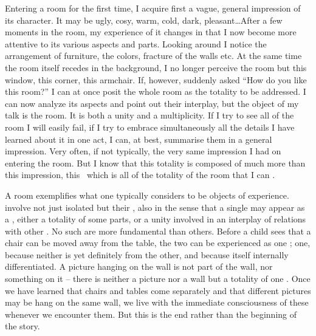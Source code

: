  \pa\label{th:complact} Entering a room for the first time, I
acquire first a vague, general impression of its character. It may be ugly,
cosy, warm, cold, dark, pleasant\ldots After a few moments in the room, my
experience of it changes in that I now become more attentive to its various
aspects and parts. Looking around I notice the arrangement of furniture, the
colors, fracture of the walls etc. At the same time the room itself recedes in
the background, I no longer perceive the room but this window, this corner, this
armchair.  If, however, suddenly asked ``How do you like this room?'' I can at
once posit the whole room as the totality to be addressed. I can now analyze its
aspects and point out their interplay, but the object of my talk is the room. It
is both a unity and a multiplicity. If I try to see all of the room I will
easily fail, if I try to embrace simultaneously all the details I have learned
about it in one act, I can, at best, summarise them in a general impression.
Very often, if not typically, the very same impression I had on entering the
room. But I know that this totality is composed of much more than this
impression, this \os\ which is all of the totality of the room that I can
.

A room exemplifies what one typically considers to be objects of experience.
 involve not just isolated  but their
, also in the sense that a single  may appear as a
, either a totality of some parts, or a unity involved in an
interplay of relations with other .  No such  are more
fundamental than others.  Before a child sees that a chair can be moved away
from the table, the two can be experienced as one ; one, because
neither is yet definitely  from the other, and 
because itself internally differentiated.  A picture hanging on the wall is not
part of the wall, nor something on it -- there is neither a picture nor a wall
but a totality of one . Once we have learned that chairs and tables
come separately and that different pictures may be hang on the same wall, we
live with the immediate consciousness of these  whenever we
encounter them. But this is the end rather than the beginning of the story.

